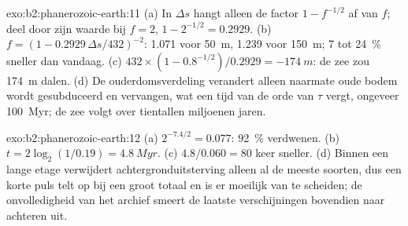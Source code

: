 \begin{solution}{exo:b2:phanerozoic-earth:11}
(a) In $\Delta s$ hangt alleen de factor $1 - f^{-1/2}$ af van $f$; deel door zijn waarde bij $f = 2$,
$1 - 2^{-1/2} = 0.2929$. (b) $f = (1 - 0.2929\,\Delta s/432)^{-2}$: 1.071 voor \qty{50}{m}, 1.239
voor \qty{150}{m}; 7 tot \qty{24}{\percent} sneller dan vandaag. (c) $432 \times (1 -
0.8^{-1/2})/0.2929 = \qty{-174}{m}$: de zee zou \qty{174}{m} dalen. (d) De ouderdomsverdeling
verandert alleen naarmate oude bodem wordt gesubduceerd en vervangen, wat een tijd van de orde van $\tau$ vergt,
ongeveer \qty{100}{Myr}; de zee volgt over tientallen miljoenen jaren.
\end{solution}

\begin{solution}{exo:b2:phanerozoic-earth:12}
(a) $2^{-7.4/2} = 0.077$: \qty{92}{\percent} verdwenen. (b) $t = 2\log_2(1/0.19) = \qty{4.8}{Myr}$.
(c) $4.8/0.060 = 80$ keer sneller. (d) Binnen een lange etage verwijdert achtergronduitsterving alleen al
de meeste soorten, dus een korte puls telt op bij een groot totaal en is er moeilijk van te scheiden; de
onvolledigheid van het archief smeert de laatste verschijningen bovendien naar achteren uit.
\end{solution}

